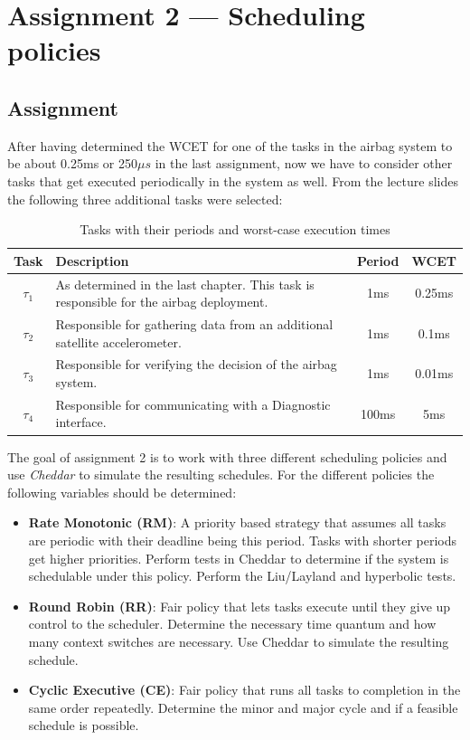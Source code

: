 \chapter{Assignment 2 --- Scheduling policies}

\section{Assignment}
After having determined the WCET for one of the tasks in the airbag system to be about 0.25ms or 250$\mu s$ in the last assignment, now we have to consider other tasks that get executed periodically in the system as well. From the lecture slides the following three additional tasks were selected: 
\label{tab:tasks}
\begin{table}[h]
    \centering
    \caption{Tasks with their periods and worst-case execution times}
    \begin{tabular}{|c|p{6cm}|c|c|}
        \hline
        \textbf{Task} & \textbf{Description} & \textbf{Period} & \textbf{WCET} \\
        \hline
        $\tau_1$ & As determined in the last chapter. This task is responsible for the airbag deployment. & 1ms & 0.25ms \\
        \hline
        $\tau_2$ & Responsible for gathering data from an additional satellite accelerometer. & 1ms & 0.1ms \\
        \hline
        $\tau_3$ & Responsible for verifying the decision of the airbag system. & 1ms & 0.01ms \\
        \hline
        $\tau_4$ & Responsible for communicating with a Diagnostic interface. & 100ms & 5ms \\
        \hline
    \end{tabular}
\end{table}
The goal of assignment 2 is to work with three different scheduling policies and use \textit{Cheddar} to simulate the resulting schedules. For the different policies the following variables should be determined: 

\begin{itemize}
    \item \textbf{Rate Monotonic (RM)}: A priority based strategy that assumes all tasks are periodic with their deadline being this period. Tasks with shorter periods get higher priorities.
    Perform tests in Cheddar to determine if the system is schedulable under this policy. Perform the Liu/Layland and hyperbolic tests. 
    \item \textbf{Round Robin (RR)}: Fair policy that lets tasks execute until they give up control to the scheduler. Determine the necessary time quantum and how many context switches are necessary. Use Cheddar to simulate the resulting schedule. 
    \item \textbf{Cyclic Executive (CE)}: Fair policy that runs all tasks to completion in the same order repeatedly. Determine the minor and major cycle and if a feasible schedule is possible. 
\end{itemize}

